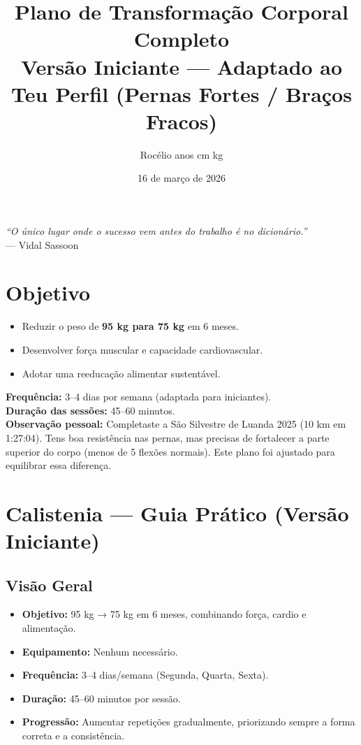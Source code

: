 \documentclass[12pt,a4paper]{scrartcl}
\title{\vspace{1cm}\Huge\textbf{Plano de Transformação Corporal Completo}\\\large Versão Iniciante — Adaptado ao Teu Perfil (Pernas Fortes / Braços Fracos)}
\author{Rocélio \qquad 20 anos \qquad 175 cm \qquad 95 kg}
\date{16 de março de 2026}
\begin{document}
\maketitle
\thispagestyle{empty}
\vspace{2cm}
\begin{center}
\textit{“O único lugar onde o sucesso vem antes do trabalho é no dicionário.”} \\[0.3cm]
— Vidal Sassoon
\end{center}
\newpage

\section*{Objetivo}
\begin{itemize}
    \item Reduzir o peso de \textbf{95 kg para 75 kg} em 6 meses.
    \item Desenvolver força muscular e capacidade cardiovascular.
    \item Adotar uma reeducação alimentar sustentável.
\end{itemize}
\textbf{Frequência:} 3–4 dias por semana (adaptada para iniciantes). \\
\textbf{Duração das sessões:} 45–60 minutos. \\
\textbf{Observação pessoal:} Completaste a São Silvestre de Luanda 2025 (10 km em 1:27:04). Tens boa resistência nas pernas, mas precisas de fortalecer a parte superior do corpo (menos de 5 flexões normais). Este plano foi ajustado para equilibrar essa diferença.

\vspace{1cm}
\tableofcontents
\newpage

\section{Calistenia — Guia Prático (Versão Iniciante)}
\subsection{Visão Geral}
\begin{itemize}
    \item \textbf{Objetivo:} 95 kg → 75 kg em 6 meses, combinando força, cardio e alimentação.
    \item \textbf{Equipamento:} Nenhum necessário.
    \item \textbf{Frequência:} 3–4 dias/semana (Segunda, Quarta, Sexta).
    \item \textbf{Duração:} 45–60 minutos por sessão.
    \item \textbf{Progressão:} Aumentar repetições gradualmente, priorizando sempre a forma correta e a consistência.
\end{itemize}
\end{document}
